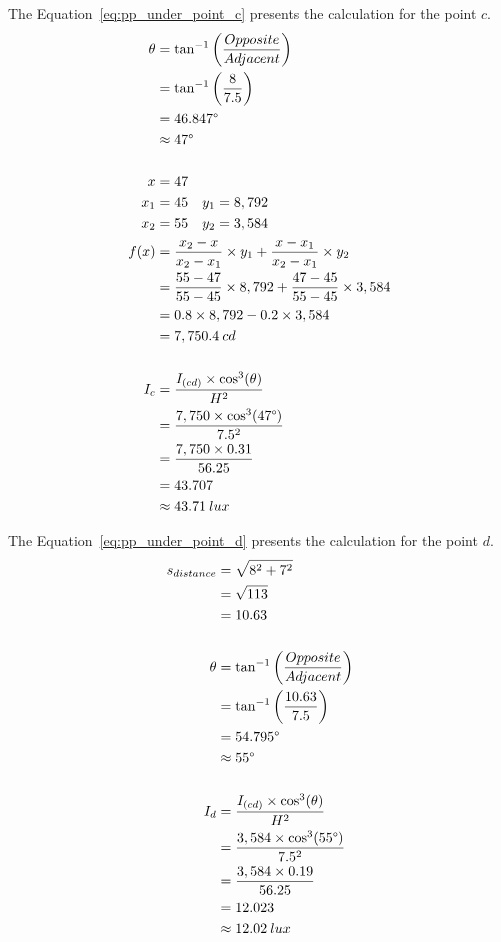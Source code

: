 The Equation~\ref{eq:pp_under_point_c} presents the calculation for the point $c$.
\begin{equation}
\begin{split}
\theta &= \tan^{-1}\left( \frac{Opposite}{Adjacent} \right) \\
 & = \tan^{-1}\left( \frac{8}{7.5} \right) \\
 & = 46.847\degree \\
 & \approx 47\degree\\
\\
x & = 47 \\
x_1 & = 45 \quad y_1 = 8,792 \\
x_2 & = 55 \quad y_2 = 3,584 \\
f(x) &= \frac{x_2 - x}{x_2 - x_1} \times y_1 +
       \frac{x - x_1}{x_2 - x_1} \times y_2 \\
 &= \frac{55 - 47}{55 - 45} \times 8,792 +
    \frac{47 - 45}{55 - 45} \times 3,584 \\
 & = 0.8 \times 8,792 - 0.2 \times 3,584 \\
 & = 7,750.4\: cd \\
\\
I_c &= \frac{I_{(cd)} \times \cos^3(\theta)}{H^2} \\
 &= \frac{7,750 \times \cos^3(47\degree)}{7.5^2} \\
 &= \frac{7,750 \times 0.31}{56.25} \\
 & = 43.707 \\
 & \approx 43.71\: lux
\end{split}
\label{eq:pp_under_point_c}
\end{equation}

The Equation~\ref{eq:pp_under_point_d} presents the calculation for the point $d$.
\begin{equation}
\begin{split}
s_{distance} & = \sqrt{8^2 + 7^2} \\
 & = \sqrt{113} \\
 & = 10.63 \\
\\
\theta &= \tan^{-1}\left( \frac{Opposite}{Adjacent} \right) \\
 & = \tan^{-1}\left( \frac{10.63}{7.5} \right) \\
 & = 54.795\degree \\
 & \approx 55\degree\\
\\
I_d &= \frac{I_{(cd)} \times \cos^3(\theta)}{H^2} \\
 &= \frac{3,584 \times \cos^3(55\degree)}{7.5^2} \\
 &= \frac{3,584 \times 0.19}{56.25} \\
 & = 12.023 \\
 & \approx 12.02\: lux
\end{split}
\label{eq:pp_under_point_d}
\end{equation}

